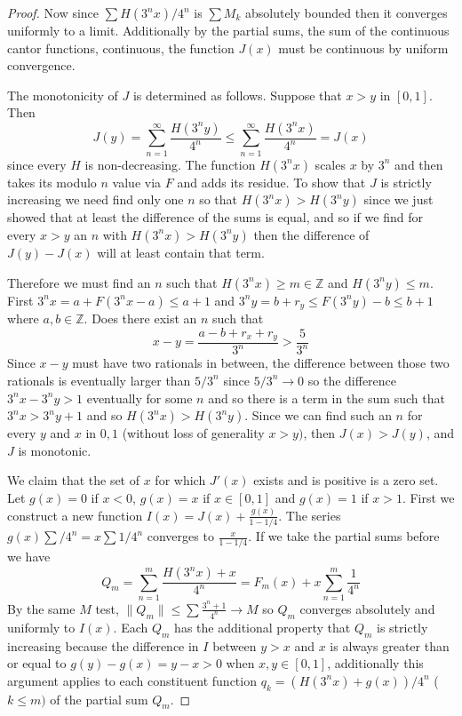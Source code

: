 \documentclass[11pt]{amsart}
\theoremstyle{definition}
\numberwithin{theorem}{section}
\numberwithin{definition}{section}
\numberwithin{equation}{section}
\begin{document}
\begin{proof}
	Now since $ \sum H(3^nx)/4^n$ is $\sum M_k$ absolutely bounded then it converges uniformly to a limit. Additionally by the partial sums, the sum of the continuous cantor functions, continuous, the function $J(x)$ must be continuous by uniform convergence. 

	The monotonicity of $J$ is determined as follows. Suppose that $x > y$ in $[0,1]$. Then 
	\begin{equation*}
		J(y) = \sum_{n=1}^\infty \frac{H(3^ny)}{4^n} \leq \sum_{n=1}^\infty \frac{H(3^nx)}{4^n} = J(x) 
	\end{equation*}
	since every $H$ is non-decreasing. The function $H(3^n x)$ scales $x$ by $3^n$ and then takes its modulo $n$ value via $F$ and adds its residue. To show that $J$ is strictly increasing we need find only one $n$ so that $H(3^nx) > H(3^ny)$ since we just showed that at least the difference of the sums is equal, and so if we find for every $x > y$ an $n$ with $H(3^nx) > H(3^ny)$ then the difference of $J(y) - J(x)$ will at least contain that term.

	Therefore we must find an $n$ such that $H(3^nx) \geq m \in \mathbb{Z}$ and $H(3^ny) \leq m.$ First $3^nx = a + F(3^nx - a) \leq a +1$ and $3^ny = b +r_y \leq F(3^ny) - b \leq b +1$ where $a,b \in \mathbb{Z}$. Does there exist an $n$ such that 
	\begin{equation*}
	x -y = \frac{a - b + r_x + r_y}{3^n} > \frac{5}{3^n} 
	\end{equation*}
	Since $x -y$ must have two rationals in between, the difference between those two rationals is eventually larger than $5/{3^n}$ since $5/3^n \to 0$ so the difference $3^nx - 3^ny > 1$ eventually for some $n$ and so there is a term in the sum such that $3^nx > 3^ny + 1$ and so $H(3^nx) > H(3^ny)$. Since we can find such an $n$ for every $y$ and $x$ in $0,1$ (without loss of generality $x > y)$, then $J(x) > J(y)$, and $J$ is monotonic.

	We claim that the set of $x$ for which $J'(x)$ exists and is positive is a zero set. Let $g(x) = 0$ if $x < 0$, $g(x) = x$ if $x \in [0,1]$ and $g(x) = 1$ if $x > 1$. First we construct a new function $I(x) = J(x) + \frac{g(x)}{1-1/4}.$ The series $g(x)\sum /4^n = x\sum 1/4^n$ converges to $\frac{x}{1-1/4}.$ If we take the partial sums before we have
	\begin{equation*}
		Q_m = \sum_{n=1}^m \frac{H(3^nx ) + x}{4^n} = F_m(x) + x\sum_{n=1}^m \frac{1}{4^n}
	\end{equation*}
	By the same $M$ test, $\|Q_m\| \leq \sum \frac{3^n + 1}{4^n} \to M$ so $Q_m$ converges absolutely  and uniformly to $I(x)$. Each $Q_m$ has the additional property that $Q_m$ is strictly increasing because the difference in $I$ between $y> x$ and $x$ is always greater than or equal to $g(y) - g(x) = y - x > 0$ when $x,y \in [0,1]$, additionally this argument applies to each constituent function $q_k = (H(3^nx) + g(x))/4^n$ ($k \leq m) $ of the partial sum $Q_m$.


\end{proof}
\end{document}
